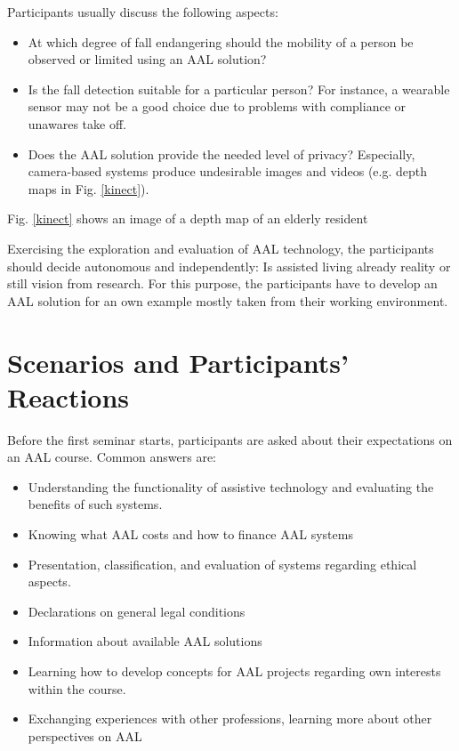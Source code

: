 \documentclass[runningheads,a4paper]{llncs}
\begin{document}
Participants usually discuss the following aspects:
\begin{itemize}
\item At which degree of fall endangering should the mobility of a person be observed or limited using an AAL solution? 
\item Is the fall detection suitable for a particular person? For instance, a wearable sensor may not be a good choice due to problems with compliance or unawares take off.
\item Does the AAL solution provide the needed level of privacy? Especially, camera-based systems produce undesirable images and videos (e.g. depth maps in Fig. \ref{kinect}). 
\end{itemize}

Fig. \ref{kinect} shows an image of a depth map of an elderly resident 

Exercising the exploration and evaluation of AAL technology, the participants should decide autonomous and independently: Is assisted living already reality or still vision from research. For this purpose, the participants have to develop an AAL solution for an own example mostly taken from their working environment.

\section{Scenarios and Participants' Reactions}\label{experiment}

Before the first seminar starts, participants are asked about their expectations on an AAL course.
Common answers are:
\begin{itemize}
\item Understanding the functionality of assistive technology and evaluating the benefits of such systems.
\item Knowing what AAL costs and how to finance AAL systems
\item Presentation, classification, and evaluation of systems regarding ethical aspects.
\item Declarations on general legal conditions
\item Information about available AAL solutions
\item Learning how to develop concepts for AAL projects regarding own interests within the course.
\item Exchanging experiences with other professions, learning more about other perspectives on AAL
\end{itemize}
\end{document}
